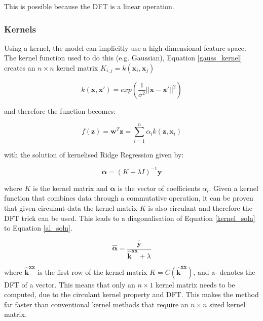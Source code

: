 \documentclass[11pt,twoside]{report}
\begin{document}
This is possible because the DFT is a linear operation. 

\subsubsection{Kernels}\label{kcf_kernels}

Using a kernel, the model can implicitly use a high-dimensional feature space. The kernel function used to do this (e.g. Gaussian), Equation \ref{gauss_kernel} creates an $n \times n$ kernel matrix $K_{i,j} = k(\mathbf{x}_{i},\mathbf{x}_{j})$

\begin{equation}
k(\mathbf{x},\mathbf{x}') = exp (\frac{1}{\sigma^{2}} ||\mathbf{x} - \mathbf{x}'||^{2})
\label{gauss_kernel}
\end{equation}

and therefore the function becomes:

\begin{equation}
f(\mathbf{z}) = \mathbf{w}^{T}\mathbf{z} = \sum_{i=1}^{n} \alpha_{i}k(\mathbf{z},\mathbf{x}_{i})
\end{equation}

with the solution of kernelised Ridge Regression given by:

\begin{equation}
\mathbf{\alpha} = (K + \lambda I)^{-1} \mathbf{y}
\label{kernel_soln}
\end{equation}

where $K$ is the kernel matrix and $\mathbf{\alpha}$ is the vector of coefficients $\alpha_{i}$. Given a kernel function that combines data through a commutative operation, it can be proven that given circulant data the kernel matrix $K$ is also circulant and therefore the DFT trick can be used. This leads to a diagonalisation of Equation \ref{kernel_soln} to Equation \ref{al_soln}.

\begin{equation}
\mathbf{\hat{\alpha}} = \frac{\mathbf{\hat{y}}}{\mathbf{\hat{k}}^{\mathbf{xx}} + \lambda}
\label{al_soln}
\end{equation}

where $\mathbf{\hat{k}}^{\mathbf{xx}}$ is the first row of the kernel matrix $K = C(\mathbf{\hat{k}}^{\mathbf{xx}})$, and a $\hat{ }$ denotes the DFT of a vector. This means that only an $n \times 1$ kernel matrix needs to be computed, due to the circulant kernel property and DFT. This makes the method far faster than conventional kernel methods that require an $n \times n$ sized kernel matrix.
\end{document}
